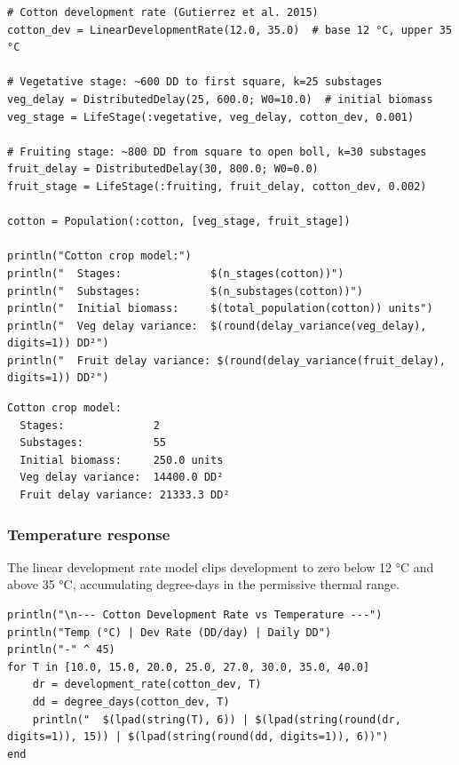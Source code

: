 \begin{verbatim}
# Cotton development rate (Gutierrez et al. 2015)
cotton_dev = LinearDevelopmentRate(12.0, 35.0)  # base 12 °C, upper 35 °C

# Vegetative stage: ~600 DD to first square, k=25 substages
veg_delay = DistributedDelay(25, 600.0; W0=10.0)  # initial biomass
veg_stage = LifeStage(:vegetative, veg_delay, cotton_dev, 0.001)

# Fruiting stage: ~800 DD from square to open boll, k=30 substages
fruit_delay = DistributedDelay(30, 800.0; W0=0.0)
fruit_stage = LifeStage(:fruiting, fruit_delay, cotton_dev, 0.002)

cotton = Population(:cotton, [veg_stage, fruit_stage])

println("Cotton crop model:")
println("  Stages:              $(n_stages(cotton))")
println("  Substages:           $(n_substages(cotton))")
println("  Initial biomass:     $(total_population(cotton)) units")
println("  Veg delay variance:  $(round(delay_variance(veg_delay), digits=1)) DD²")
println("  Fruit delay variance: $(round(delay_variance(fruit_delay), digits=1)) DD²")
\end{verbatim}




\begin{verbatim}
Cotton crop model:
  Stages:              2
  Substages:           55
  Initial biomass:     250.0 units
  Veg delay variance:  14400.0 DD²
  Fruit delay variance: 21333.3 DD²
\end{verbatim}



\subsubsection{Temperature response}



\label{7655926435328107426}{}


The linear development rate model clips development to zero below 12 °C and above 35 °C, accumulating degree-days in the permissive thermal range.




\begin{verbatim}
println("\n--- Cotton Development Rate vs Temperature ---")
println("Temp (°C) | Dev Rate (DD/day) | Daily DD")
println("-" ^ 45)
for T in [10.0, 15.0, 20.0, 25.0, 27.0, 30.0, 35.0, 40.0]
    dr = development_rate(cotton_dev, T)
    dd = degree_days(cotton_dev, T)
    println("  $(lpad(string(T), 6)) | $(lpad(string(round(dr, digits=1)), 15)) | $(lpad(string(round(dd, digits=1)), 6))")
end
\end{verbatim}




